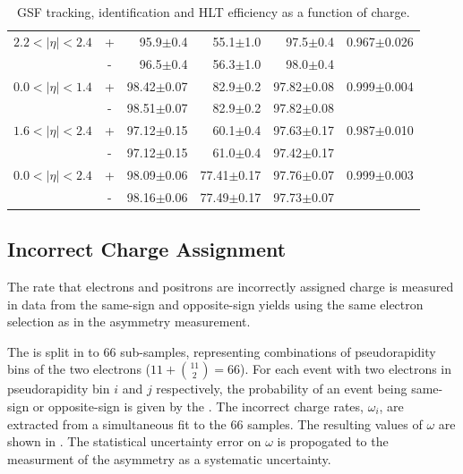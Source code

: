 \begin{table}[htbp]
\begin{center}
\begin{tabular}{lcrrrr}
$2.2<| \eta |<2.4$ &+& 95.9$\pm$0.4 &55.1$\pm$1.0 &97.5$\pm$0.4 & 0.967$\pm$0.026\\
                   &-& 96.5$\pm$0.4 &56.3$\pm$1.0 &98.0$\pm$0.4 & \\
\midrule
$0.0<| \eta |<1.4$ &+& 98.42$\pm$0.07 &82.9$\pm$0.2 &97.82$\pm$0.08 & 0.999$\pm$0.004\\
                   &-& 98.51$\pm$0.07 &82.9$\pm$0.2 &97.82$\pm$0.08 & \\
$1.6<| \eta |<2.4$ &+& 97.12$\pm$0.15 &60.1$\pm$0.4 &97.63$\pm$0.17 & 0.987$\pm$0.010\\
                   &-& 97.12$\pm$0.15 &61.0$\pm$0.4 &97.42$\pm$0.17 & \\
\midrule
$0.0<| \eta |<2.4$ &+& 98.09$\pm$0.06 &77.41$\pm$0.17 &97.76$\pm$0.07 & 0.999$\pm$0.003\\
                   &-& 98.16$\pm$0.06 &77.49$\pm$0.17 &97.73$\pm$0.07 & \\
\bottomrule
\end{tabular}
\end{center}
\caption{\label{tab:updatedefficiency} GSF tracking, identification and HLT efficiency as a function of charge\cite{bendavid2011electron}.}
\end{table}

\subsection{Incorrect Charge Assignment}
The rate that electrons and positrons are incorrectly assigned charge is measured
in data from the same-sign and opposite-sign \PZ yields using the same electron
selection as in the asymmetry measurement.

The \HepProcess{\PZ\to\Pe\Pe} is split in to 66 sub-samples, representing
combinations of pseudorapidity bins of the two electrons ($11+\binom{11}{2} =
66$).
For each \PZ event with two electrons in pseudorapidity bin $i$ and $j$
respectively, the probability of an event being same-sign or opposite-sign is
given by the . The incorrect charge rates,
$\omega_i$, are extracted from a simultaneous fit to the 66 samples.
The resulting values of $\omega$ are shown in . The
statistical uncertainty error on $\omega$ is propogated to the measurment of the
asymmetry as a systematic uncertainty.

